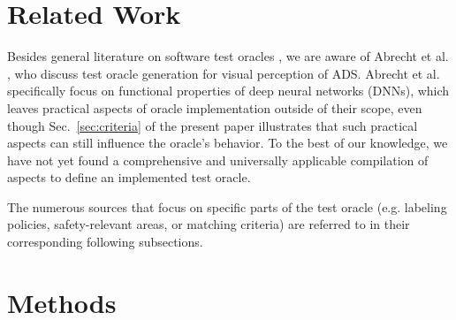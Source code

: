 \documentclass[conference]{IEEEtran}
\begin{document}

\section{Related Work}
\label{sec:related_work}

Besides general literature on software test oracles \cite{Barr2015oracle}, we are aware of Abrecht et al. \cite{Abrecht2021testing}, who discuss test oracle generation for visual perception of ADS.
Abrecht et al. specifically focus on functional properties of deep neural networks (DNNs), which leaves practical aspects of oracle implementation outside of their scope, even though Sec.~\ref{sec:criteria} of the present paper illustrates that such practical aspects can still influence the oracle's behavior.
To the best of our knowledge, we have not yet found a comprehensive and universally applicable compilation of aspects to define an implemented test oracle.

The numerous sources that focus on specific parts of the test oracle (e.g. labeling policies, safety-relevant areas, or matching criteria) are referred to in their corresponding following subsections. %




\section{Methods} %
\label{sec:method}
\end{document}
